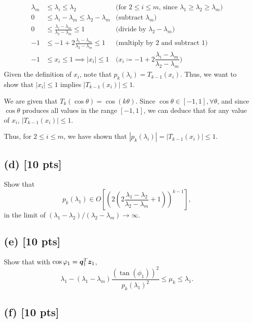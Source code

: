 \documentclass[twoside,10pt]{article}
\begin{document}
\begin{align*}
  \lambda_m &\leq \lambda_i \leq \lambda_2&\text{(for $2 \leq i \leq m$, since $\lambda_{1} \geq \lambda_{2} \geq \lambda_{m}$)}\\
  0 &\leq \lambda_i - \lambda_m \leq \lambda_2 - \lambda_m&\text{(subtract $\lambda_m$)}\\
  0 &\leq \frac{\lambda_i - \lambda_m}{\lambda_2 - \lambda_m} \leq 1&\text{(divide by $\lambda_2 - \lambda_m$)}\\
  -1 &\leq -1 + 2 \frac{\lambda_i - \lambda_m}{\lambda_2 - \lambda_m} \leq 1 &\text{(multiply by 2 and subtract 1)}\\
  -1 &\leq x_i \leq 1 \implies |x_i| \leq 1&\text{($x_i \coloneqq - 1 + 2 \dfrac{\lambda_i - \lambda_m}{\lambda_2 - \lambda_m}$)}
\end{align*}
Given the definition of $x_i$, note that $p_k(\lambda_i) = T_{k - 1}(x_i)$.
Thus, we want to show that $|x_i| \leq 1$ implies $|T_{k - 1}(x_i)| \leq 1$.

We are given that $T_k\left(\cos \theta\right) = \cos\left(k \theta \right)$.
Since $\cos \theta \in [-1, 1], \forall \theta$, and since $\cos \theta$ produces all values in the range $[-1, 1]$, we can deduce that for any value of $x_i$, $|T_{k - 1}(x_i)| \leq 1$.

Thus, for $2 \leq i \leq m$, we have shown that $|p_k(\lambda_i)| = |T_{k - 1}(x_i)| \leq 1$.

\subsection*{(d) [10 pts]}
Show that
\begin{equation}
  p_k(\lambda_1) \in O\left[ \left(2 \left(2 \frac{\lambda_1 - \lambda_2}{\lambda_2 - \lambda_m} + 1\right)\right)^{k - 1} \right],
\end{equation}
in the limit of $(\lambda_{1} - \lambda_{2}) / (\lambda_{2} - \lambda_{m}) \rightarrow \infty$. 

\subsection*{(e) [10 pts]}
Show that with $\cos{\varphi_1} = \bm{q}_1^T \bm{z}_1$, 
\begin{equation}
  \lambda_{1} - (\lambda_{1} - \lambda_{m}) \frac{(\tan (\phi_1))^2}{p_{k}(\lambda_1)^2} \leq \mu_{k} \leq \lambda_1.
\end{equation}

\subsection*{(f) [10 pts]}
\end{document}
